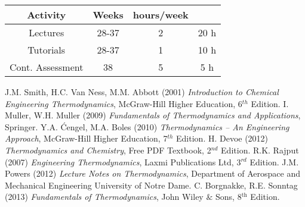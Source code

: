 \documentclass[11pt,oneside,a4paper]{article}
\begin{document}
\begin{center}
\begin{tabular}{||c c  c c ||}
\hline\hline
{\bf Activity}    & {\bf Weeks}  &  {\bf hours/week}  &       \\
\hline\hline
Lectures          &  28-37       &  2                 &  20 h  \\
Tutorials         &  28-37       &  1                 &  10 h  \\
Cont. Assessment  &  38          &  5                 &  5  h  \\
\hline\hline
\end{tabular}
\end{center}
 
\begin{thebibliography}{1}
%
 J.M. Smith, H.C. Van Ness, M.M. Abbott (2001) {\it Introduction to Chemical Engineering Thermodynamics}, McGraw-Hill Higher Education, 6$^{th}$ Edition.
%
 I. Muller, W.H. Muller (2009) {\it Fundamentals of Thermodynamics and Applications}, Springer.
%
 Y.A. \'Cengel, M.A. Boles (2010) {\it Thermodynamics -- An Engineering Approach}, McGraw-Hill Higher Education, 7$^{th}$ Edition.
%
 H. Devoe (2012) {\it Thermodynamics and Chemistry}, Free PDF Textbook, 2$^{nd}$ Edition.
%
 R.K. Rajput (2007) {\it Engineering Thermodynamics}, Laxmi Publications Ltd, 3$^{rd}$ Edition.
%
 J.M. Powers (2012) {\it Lecture Notes on Thermodynamics}, Department of Aerospace and Mechanical Engineering University of Notre Dame.
%
 C. Borgnakke, R.E. Sonntag (2013) {\it Fundamentals of Thermodynamics}, John Wiley $\&$ Sons, 8$^{\text{th}}$ Edition.
%
\end{thebibliography}
\end{document}
